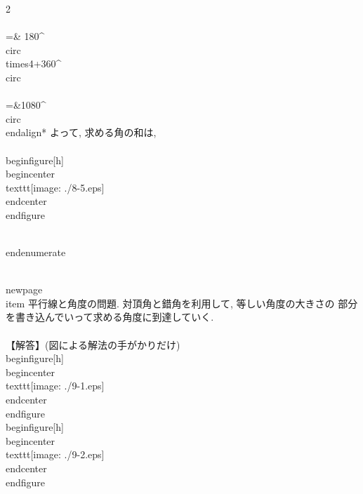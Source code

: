	      2 \\\\
	       =& 180^{\\circ}\\times4+360^{\\circ} \\\\ =&1080^{\\circ} 
	      \\end{align*}
	      よって, 求める角の和は,
	      \\[
	       1080^{\\circ}-360^{\\circ}\\times2=\\underline{360^{\\circ}}
	      \\]
	      \\begin{figure}[h]
	       \\begin{center}
		\\texttt{[image: ./8-5.eps]}
	       \\end{center}
	      \\end{figure}

       \\end{enumerate}
       
 \\newpage
 \\item 平行線と角度の問題. 対頂角と錯角を利用して, 等しい角度の大きさの
       部分を書き込んでいって求める角度に到達していく.\\\\
       【解答】(図による解法の手がかりだけ)
       \\begin{figure}[h]
	\\begin{center}
	 \\texttt{[image: ./9-1.eps]}
	\\end{center}
       \\end{figure}
       \\begin{figure}[h]
	\\begin{center}
	 \\texttt{[image: ./9-2.eps]}
	\\end{center}
       \\end{figure}


